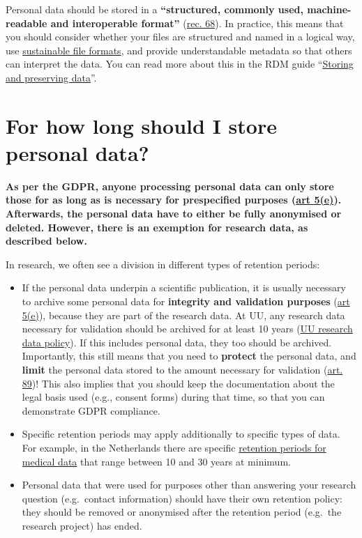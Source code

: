 \documentclass[
]{book}
\providecommand{\tightlist}{%
  \setlength{\itemsep}{0pt}\setlength{\parskip}{0pt}}
\begin{document}
Personal data should be stored in a \textbf{``structured, commonly used, machine-readable
and interoperable format''} (\href{https://gdpr.eu/Recital-68-Right-of-data-portability/}{rec. 68}).
In practice, this means that you should consider whether your files are
structured and named in a logical way, use
\href{https://dans.knaw.nl/en/file-formats/}{sustainable file formats},
and provide understandable metadata so that others can interpret the data.
You can read more about this in the RDM guide
``\href{https://www.uu.nl/en/research/research-data-management/guides/storing-and-preserving-data}{Storing and preserving data}''.

\hypertarget{data-storage-duration}{%
\section{For how long should I store personal data?}\label{data-storage-duration}}

\textbf{As per the GDPR, anyone processing personal data can only store those for as
long as is necessary for prespecified purposes
(\href{https://gdpr-info.eu/art-5-gdpr/}{art 5(e)}).
Afterwards, the personal data have to either be fully anonymised or deleted.
However, there is an exemption for research data, as described below.}

In research, we often see a division in different types of retention periods:

\begin{itemize}
\tightlist
\item
  If the personal data underpin a scientific publication, it is usually necessary
  to archive some personal data for \textbf{integrity and validation purposes}
  (\href{https://gdpr-info.eu/art-5-gdpr/}{art 5(e)}),
  because they are part of the research data. At UU, any research data necessary
  for validation should be archived for at least 10 years
  (\href{https://www.uu.nl/sites/default/files/university_policy_framework_for_research_data_utrecht_university_-_january_2016.pdf}{UU research data policy}).
  If this includes personal data, they too should be archived. Importantly, this
  still means that you need to \textbf{protect} the personal data, and \textbf{limit} the personal
  data stored to the amount necessary for validation
  (\href{https://gdpr-info.eu/art-89-gdpr/}{art. 89})!
  This also implies that you should keep the documentation about the legal basis
  used (e.g., consent forms) during that time, so that you can demonstrate GDPR
  compliance.
\item
  Specific retention periods may apply additionally to specific types of data.
  For example, in the Netherlands there are specific
  \href{https://english.ccmo.nl/investigators/data-retention-periods-for-medical-research}{retention periods for medical data}
  that range between 10 and 30 years at minimum.
\item
  Personal data that were used for purposes other than answering your
  research question (e.g.~contact information) should have their own retention
  policy: they should be removed or anonymised after the retention period
  (e.g.~the research project) has ended.
\end{itemize}
\end{document}
